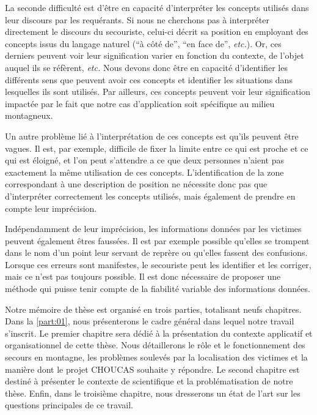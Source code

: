 La seconde difficulté est d'être en capacité d'interpréter les
concepts utilisés dans leur discours par les requérants. Si nous ne
cherchons pas à interpréter directement le discours du secouriste,
celui-ci décrit sa position en employant des concepts issus du langage
naturel (\eg \enquote{à côté de}, \enquote{en face de},
\emph{etc.}). Or, ces derniers peuvent voir leur signification varier
en fonction du contexte, de l'objet auquel ils se réfèrent,
\emph{etc.}  Nous devons donc être en capacité d'identifier les
différents sens que peuvent avoir ces concepts et identifier les
situations dans lesquelles ils sont utilisés. Par ailleurs, ces
concepts peuvent voir leur signification impactée par le fait que
notre cas d’application soit spécifique au milieu montagneux.

Un autre problème lié à l'interprétation de ces concepts est qu'ils
peuvent être vagues.  Il est, par exemple, difficile de fixer la
limite entre ce qui est proche et ce qui est éloigné, et l'on peut
s'attendre a ce que deux personnes n'aient pas exactement la même
utilisation de ces concepts. L’identification de la zone correspondant
à une description de position ne nécessite donc pas que d'interpréter
correctement les concepts utilisés, mais également de prendre en
compte leur imprécision.

Indépendamment de leur imprécision, les informations données par les
victimes peuvent également êtres faussées. Il est par exemple possible
qu'elles se trompent dans le nom d'un point leur servant de reprère ou
qu'elles fassent des confusions. Lorsque ces erreurs sont manifestes,
le secouriste peut les identifier et les corriger, mais ce n'est pas
toujours possible. Il est donc nécessaire de proposer une méthode qui
puisse tenir compte de la fiabilité variable des informations données.



Notre mémoire de thèse est organisé en trois parties, totalisant neufs
chapitres. Dans la \autoref{part:01}, nous présenterons le cadre
général dans lequel notre travail s'inscrit. Le premier chapitre sera
dédié à la présentation du contexte applicatif et organisationnel de
cette thèse. Nous détaillerons le rôle et le fonctionnement des
secours en montagne, les problèmes soulevés par la localisation des
victimes et la manière dont le projet CHOUCAS souhaite y répondre. Le
second chapitre est destiné à présenter le contexte de scientifique et
la problématisation de notre thèse. Enfin, dans le troisième chapitre,
nous dresserons un état de l'art sur les questions principales de ce
travail.


